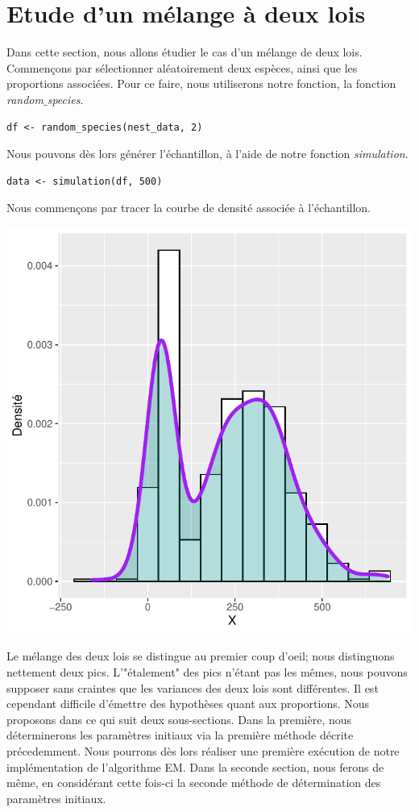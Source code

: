 \documentclass[frenchb]{report}
\newcommand{\1}{\mathbbm{1}}
\theoremstyle{definition}\newtheorem{defn}{Définition}
\theoremstyle{definition}\newtheorem{exm}{Exemple}
\theoremstyle{definition}\newtheorem{nota}{Notation}
\theoremstyle{definition}\newtheorem{rem}{Remarque}
\begin{document}
\section{Etude d'un mélange à deux lois}
Dans cette section, nous allons étudier le cas d'un mélange de deux lois. Commençons par sélectionner aléatoirement deux espèces, ainsi que les proportions associées. Pour ce faire, nous utiliserons notre fonction, la fonction \textit{random$\_$species}. 

\begin{lstlisting}
df <- random_species(nest_data, 2)
\end{lstlisting}

Nous pouvons dès lors générer l'échantillon, à l'aide de notre fonction \textit{simulation}.

\begin{lstlisting}
data <- simulation(df, 500)
\end{lstlisting}

Nous commençons par tracer la courbe de densité associée à l'échantillon.
\begin{center}
\includegraphics[scale=0.8]{dens_1.pdf}
\end{center}
Le mélange des deux lois se distingue au premier coup d'oeil; nous distinguons nettement deux pics. L'"étalement" des pics n'étant pas les mêmes, nous pouvons supposer sans craintes que les variances des deux lois sont différentes. Il est cependant difficile d'émettre des hypothèses quant aux proportions.\newline
Nous proposons dans ce qui suit deux sous-sections. Dans la première, nous déterminerons les paramètres initiaux via la première méthode décrite précedemment. Nous pourrons dès lors réaliser une première exécution de notre implémentation de l'algorithme EM.
Dans la seconde section, nous ferons de même, en considérant cette fois-ci la seconde méthode de détermination des paramètres initiaux.
\end{document}
